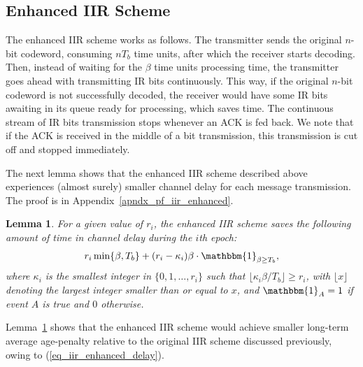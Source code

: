 \documentclass[12pt,journal,onecolumn]{IEEEtran}
\newtheorem{lemma}{Lemma}
\begin{document}
\subsection{Enhanced IIR Scheme}

The enhanced IIR scheme works as follows. The transmitter sends the original $n$-bit codeword, consuming $nT_b$ time units, after which the receiver starts decoding. Then, instead of waiting for the $\beta$ time units processing time, the transmitter goes ahead with transmitting IR bits continuously. This way, if the original $n$-bit codeword is not successfully decoded, the receiver would have some IR bits awaiting in its queue ready for processing, which saves time. The continuous stream of IR bits transmission stops whenever an ACK is fed back. We note that if the ACK is received in the middle of a bit transmission, this transmission is cut off and stopped immediately.

The next lemma shows that the enhanced IIR scheme described above experiences (almost surely) smaller channel delay for each message transmission. The proof is in Appendix~\ref{apndx_pf_iir_enhanced}.

\begin{lemma} \label{thm_iir_enhanced}
For a given value of $r_i$, the enhanced IIR scheme saves the following amount of time in channel delay during the $i$th epoch:
\begin{align} \label{eq_iir_enhanced_delay}
r_i\min\{\beta,T_b\}+(r_i-\kappa_i)\beta \cdot \mathbbm{1}_{\beta\geq T_b}, 
\end{align}
where $\kappa_i$ is the smallest integer in $\{0,1,\dots,r_i\}$ such that $\lfloor\kappa_i\beta/T_b\rfloor\geq r_i$, with $\lfloor x\rfloor$ denoting the largest integer smaller than or equal to $x$, and $\mathbbm{1}_A=1$ if event $A$ is true and $0$ otherwise.
\end{lemma}

Lemma~\ref{thm_iir_enhanced} shows that the enhanced IIR scheme would achieve smaller long-term average age-penalty relative to the original IIR scheme discussed previously, owing to (\ref{eq_iir_enhanced_delay}).
\end{document}

